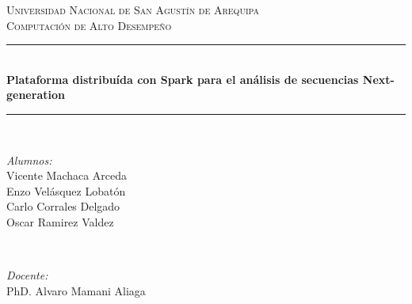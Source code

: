 \documentclass{article}
\newcommand{\csdocente}{
    Vicente Machaca Arceda \\
    Enzo Velásquez Lobatón \\
	Carlo Corrales Delgado\\
	Oscar Ramirez Valdez
	}
\newcommand{\cscurso}{Computación de Alto Desempeño}
\newcommand{\csuniversidad}{Universidad Nacional de San Agustín de Arequipa}
\newcommand{\cstema}{Plataforma distribuída con Spark para el análisis de secuencias Next-generation}
\begin{document}
	
	
	
	
\begin{titlepage}
	
	\newcommand{\HRule}{\rule{\linewidth}{0.5mm}} %
	
	\center %
	
	
	\textsc{\LARGE \csuniversidad}\\[1.5cm] %
	\textsc{\Large \cscurso}\\[0.5cm] %
	
	
	\vspace{2cm}
	
	\HRule \\[0.4cm]
	{ \huge \bfseries \cstema}\\[0.4cm] %
	\HRule \\[1.5cm]
	
	
	\begin{minipage}{0.4\textwidth}
		\begin{flushleft} \large
			\emph{Alumnos:}\\
			\csdocente
		\end{flushleft}
	\end{minipage}
	~
	\begin{minipage}{0.4\textwidth}
		\begin{flushright} \large
			\emph{Docente:} \\
			PhD. Alvaro Mamani Aliaga
		\end{flushright}
	\end{minipage}\\[2cm]
	

\end{titlepage}
\end{document}
